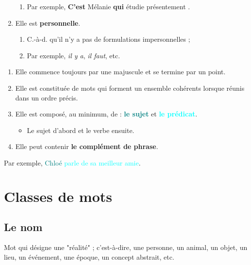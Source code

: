 \documentclass[10pt, french]{article}
\begin{document}
\begin{multicols*}{2}
\begin{definitionNOHFILLprop}
\begin{enumerate}
\begin{enumerate}
		\item	Par exemple, \og \textbf{C'est} Mélanie \textbf{qui} étudie présentement \fg{}.
		\end{enumerate}
	\item	Elle est \textbf{personnelle}.
		\begin{enumerate}
		\item	C.-à-d. qu'il n'y a pas de formulations impersonnelles ;
		\item	Par exemple, \textit{il y a}, \textit{il faut}, etc.
		\end{enumerate}
\end{enumerate}
\end{definitionNOHFILLprop}

\begin{definitionNOHFILLpropos}[Caractéristiques]
\begin{enumerate}
	\item	Elle commence toujours par une majuscule et se termine par un point.
	\item	Elle est constituée de mots qui forment un ensemble cohérents lorsque réunis dans un ordre précis.
	\item	Elle est composé, au minimum, de : \textbf{\textcolor{teal}{le sujet}} et \textbf{\textcolor{cyan}{le prédicat}}.
		\begin{itemize}
		\item	Le sujet d'abord et le verbe ensuite.
		\end{itemize}
	\item	Elle peut contenir \textbf{le complément de phrase}.
\end{enumerate}
\tcbline
Par exemple, \textcolor{teal}{Chloé} \textcolor{cyan}{parle de sa meilleur amie}.
\end{definitionNOHFILLpropos}




\newpage
\section{Classes de mots}
\subsection{Le nom}
\begin{definitionNOHFILL}[Le nom]
Mot qui désigne une "réalité" ; c'est-à-dire, une personne, un animal, un objet, un lieu, un événement, une époque, un concept abstrait, etc.	\\


\end{definitionNOHFILL}
\end{multicols*}
\end{document}
